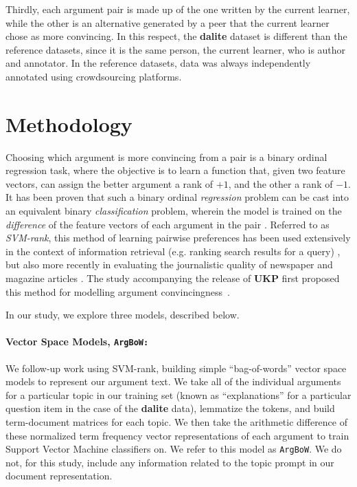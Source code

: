 \documentclass[runningheads]{llncs}
\begin{document}
Thirdly, each argument pair is made up of the one written by the current 
learner, while the other is an alternative generated by a peer that the current 
learner chose as more convincing. 
In this respect, the \textbf{dalite} dataset is different than the 
reference datasets, since it is the same person, the current learner, who is 
author and annotator. In the reference datasets, data was always independently 
annotated using crowdsourcing platforms.


\section{Methodology}

Choosing which argument is more convincing from a pair is a binary 
ordinal regression task, where the objective is to learn a function that, given 
two feature vectors, can assign the better argument a rank of $+1$, and the 
other a rank of $-1$.   
It has been proven that such a binary ordinal \textit{regression} problem can 
be cast into an equivalent binary \textit{classification} problem, wherein the 
model is trained on the \textit{difference} of the feature vectors of each 
argument in the pair \cite{herbrich_support_1999}. 
Referred to as \textit{SVM-rank}, this method of learning pairwise preferences 
has been used extensively in the context of information retrieval (e.g. ranking 
search results for a query) 
\cite{joachims_optimizing_2002}, but also more recently in evaluating the 
journalistic quality of newspaper and magazine articles \cite{louis_what_2013}.
The study accompanying the release of \textbf{UKP} first proposed this method 
for modelling argument convincingness~\cite{habernal_which_2016}.

In our study, we explore three models, described below.

\paragraph{\textbf{Vector Space Models, \tt{ArgBoW}:}}

We follow-up work using SVM-rank, building simple ``bag-of-words'' vector space 
models to represent our argument text. 
We take all of the individual arguments for a particular topic in our training 
set (known as  ``explanations'' for a particular question item in the case of 
the \textbf{dalite} data), lemmatize the tokens, and build term-document 
matrices for each topic.
We then take the arithmetic difference of these normalized term frequency 
vector representations of each argument to train Support Vector Machine 
classifiers on. 
We refer to this model as \verb|ArgBoW|.
We do not, for this study, include any information related to the topic prompt 
in our document representation.
\end{document}
